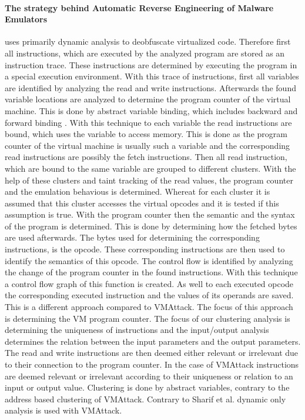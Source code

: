 \documentclass[10pt,twoside,a4paper,bibliography=totoc]{scrbook}
\begin{document}
\paragraph*{The strategy behind Automatic Reverse Engineering of Malware Emulators}uses primarily dynamic analysis to deobfuscate virtualized code. Therefore first all instructions, which are executed by the analyzed program are stored as an instruction trace. These instructions are determined by executing the program in a special execution environment. 
With this trace of instructions, first all variables are identified by analyzing the read and write instructions. 
Afterwards the found variable locations are analyzed to determine the program counter of the virtual machine. 
This is done by abstract variable binding, which includes backward and forward binding \cite{DBLP:conf/sp/SharifLGL09}. 
With this technique to each variable the read instructions are bound, which uses the variable to access memory. 
This is done as the program counter of the virtual machine is usually such a variable and the corresponding read instructions are possibly the fetch instructions. 
Then all read instruction, which are bound to the same variable are grouped to different clusters. 
With the help of these clusters and taint tracking of the read values, the program counter and the emulation behavious is determined. 
Whereat for each cluster it is assumed that this cluster accesses the virtual opcodes and it is tested if this assumption is true. 
With the program counter then the semantic and the syntax of the program is determined. 
This is done by determining how the fetched bytes are used afterwards. The bytes used for determining the corresponding instructions, is the opcode.
These corresponding instructions are then used to identify the semantics of this opcode. 
The control flow is identified by analyzing the change of the program counter in the found instructions. With this technique a control flow graph of this function is created. As well to each executed opcode the corresponding executed instruction and the values of its operands are saved.\\
This is a different approach compared to VMAttack. The focus of this approach is determining the VM program counter. The focus of our clustering analysis is determining the uniqueness of instructions and the input/output analysis determines the relation between the input parameters and the output parameters.
The read and write instructions are then deemed either relevant or irrelevant due to their connection to the program counter. In the case of VMAttack instructions are deemed relevant or irrelevant according to their uniqueness or relation to an input or output value.
Clustering is done by abstract variables, contrary to the address based clustering of VMAttack.
Contrary to Sharif et al. dynamic only analysis is used with VMAttack.
\end{document}
